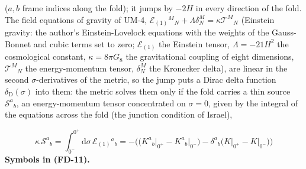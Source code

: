 \documentclass[
  10pt,
]{article}
\begin{document}
(\(a, b\) frame indices along the fold); it jumps by \(-2H\) in every
direction of the fold. The field equations of gravity of UM-4,
\(\mathcal{E}_{(1)}{}^M{}_N + \Lambda\delta^M_N = \kappa\mathcal{T}^M{}_N\)
(Einstein gravity: the author's Einstein-Lovelock equations with the
weights of the Gauss-Bonnet and cubic terms set to zero;
\(\mathcal{E}_{(1)}\) the Einstein tensor, \(\Lambda = -21H^2\) the
cosmological constant, \(\kappa = 8\pi G_8\) the gravitational coupling
of eight dimensions, \(\mathcal{T}^M{}_N\) the energy-momentum tensor,
\(\delta^M_N\) the Kronecker delta), are linear in the second
\(\sigma\)-derivatives of the metric, so the jump puts a Dirac delta
function \(\delta_{\mathrm{D}}(\sigma)\) into them: the metric solves
them only if the fold carries a thin source \(\mathcal{S}^a{}_b\), an
energy-momentum tensor concentrated on \(\sigma = 0\), given by the
integral of the equations across the fold (the junction condition of
Israel),

\[
\kappa\,\mathcal{S}^a{}_b = \int_{0^-}^{0^+}\mathrm{d}\sigma\,\mathcal{E}_{(1)}{}^a{}_b
 = -\Big(\big(K^a{}_b\big\vert_{0^+} - K^a{}_b\big\vert_{0^-}\big) - \delta^a{}_b\big(K\big\vert_{0^+} - K\big\vert_{0^-}\big)\Big) \tag{FD-11}
\] \textbf{Symbols in (FD-11).}
\end{document}
